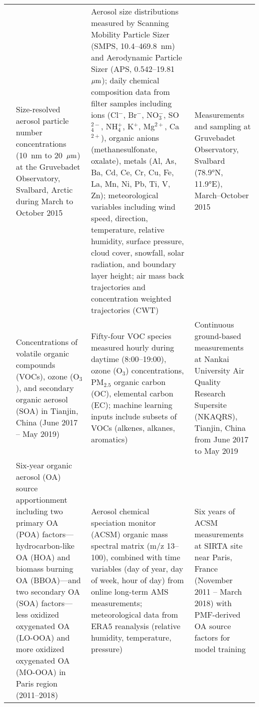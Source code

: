 \documentclass[11pt]{article}
\begin{document}
\begin{landscape}
\begin{longtable}{>{\raggedright\arraybackslash}p{2cm} 
        >{\raggedright\arraybackslash}p{4cm} 
        >{\raggedright\arraybackslash}p{10cm} 
        >{\raggedright\arraybackslash}p{6cm}}
\citet{song2022understanding} & Size-resolved aerosol particle number concentrations (10~nm to 20~\(\mu \rm m\)) at the Gruvebadet Observatory, Svalbard, Arctic during March to October 2015 & Aerosol size distributions measured by Scanning Mobility Particle Sizer (SMPS, 10.4–469.8~nm) and Aerodynamic Particle Sizer (APS, 0.542–19.81~\(\mu \rm m\)); daily chemical composition data from filter samples including ions (Cl$^-$, Br$^-$, NO$_3^-$, SO$_4^{2-}$, NH$_4^+$, K$^+$, Mg$^{2+}$, Ca$^{2+}$), organic anions (methanesulfonate, oxalate), metals (Al, As, Ba, Cd, Ce, Cr, Cu, Fe, La, Mn, Ni, Pb, Ti, V, Zn); meteorological variables including wind speed, direction, temperature, relative humidity, surface pressure, cloud cover, snowfall, solar radiation, and boundary layer height; air mass back trajectories and concentration weighted trajectories (CWT) & Measurements and sampling at Gruvebadet Observatory, Svalbard (78.9°N, 11.9°E), March–October 2015 \\[6pt]

\citet{wang2022machine} & Concentrations of volatile organic compounds (VOCs), ozone (O$_3$), and secondary organic aerosol (SOA) in Tianjin, China (June 2017 – May 2019) & Fifty-four VOC species measured hourly during daytime (8:00–19:00), ozone (O$_3$) concentrations, PM$_{2.5}$ organic carbon (OC), elemental carbon (EC); machine learning inputs include subsets of VOCs (alkenes, alkanes, aromatics) & Continuous ground-based measurements at Nankai University Air Quality Research Supersite (NKAQRS), Tianjin, China from June 2017 to May 2019 \\[6pt]

\citet{zhang2025ensemble} & Six-year organic aerosol (OA) source apportionment including two primary OA (POA) factors—hydrocarbon-like OA (HOA) and biomass burning OA (BBOA)—and two secondary OA (SOA) factors—less oxidized oxygenated OA (LO-OOA) and more oxidized oxygenated OA (MO-OOA) in Paris region (2011–2018) & Aerosol chemical speciation monitor (ACSM) organic mass spectral matrix (m/z 13–100), combined with time variables (day of year, day of week, hour of day) from online long-term AMS measurements; meteorological data from ERA5 reanalysis (relative humidity, temperature, pressure) & Six years of ACSM measurements at SIRTA site near Paris, France (November 2011 – March 2018) with PMF-derived OA source factors for model training \\[6pt]


\end{longtable}
\end{landscape}
\end{document}
